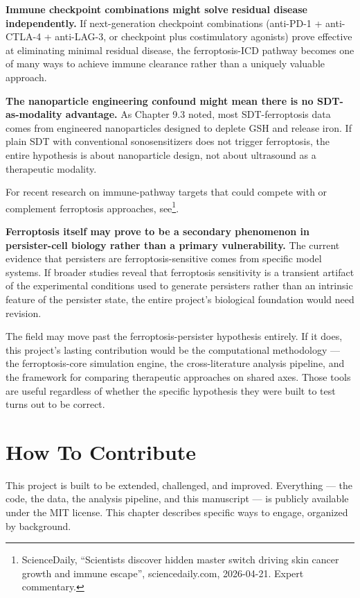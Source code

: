 \documentclass[11pt,twoside,openright]{report}
\begin{document}
\textbf{Immune checkpoint combinations might solve residual disease independently.} If next-generation checkpoint combinations (anti-PD-1 + anti-CTLA-4 + anti-LAG-3, or checkpoint plus costimulatory agonists) prove effective at eliminating minimal residual disease, the ferroptosis-ICD pathway becomes one of many ways to achieve immune clearance rather than a uniquely valuable approach.

\textbf{The nanoparticle engineering confound might mean there is no SDT-as-modality advantage.} As Chapter 9.3 noted, most SDT-ferroptosis data comes from engineered nanoparticles designed to deplete GSH and release iron. If plain SDT with conventional sonosensitizers does not trigger ferroptosis, the entire hypothesis is about nanoparticle design, not about ultrasound as a therapeutic modality.

For recent research on immune-pathway targets that could compete with or complement ferroptosis approaches, see\footnote{ScienceDaily, ``Scientists discover hidden master switch driving skin cancer growth and immune escape'', sciencedaily.com, 2026-04-21. Expert commentary.}.

\textbf{Ferroptosis itself may prove to be a secondary phenomenon in persister-cell biology rather than a primary vulnerability.} The current evidence that persisters are ferroptosis-sensitive comes from specific model systems. If broader studies reveal that ferroptosis sensitivity is a transient artifact of the experimental conditions used to generate persisters rather than an intrinsic feature of the persister state, the entire project's biological foundation would need revision.

The field may move past the ferroptosis-persister hypothesis entirely. If it does, this project's lasting contribution would be the computational methodology --- the ferroptosis-core simulation engine, the cross-literature analysis pipeline, and the framework for comparing therapeutic approaches on shared axes. Those tools are useful regardless of whether the specific hypothesis they were built to test turns out to be correct.
\dinkus
{}
\chapter{How To Contribute}


This project is built to be extended, challenged, and improved. Everything --- the code, the data, the analysis pipeline, and this manuscript --- is publicly available under the MIT license. This chapter describes specific ways to engage, organized by background.
\end{document}
